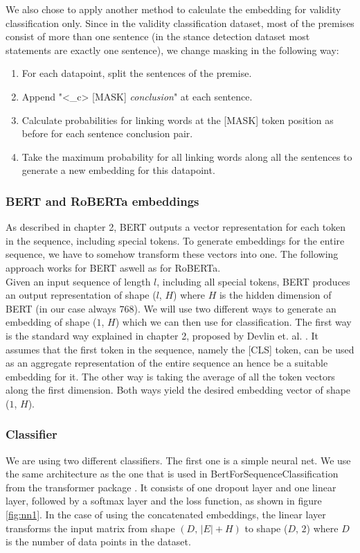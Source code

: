 We also chose to apply another method to calculate the embedding for validity classification only. Since in the validity classification dataset, most of the premises consist of more than one sentence (in the stance detection dataset most statements are exactly one sentence), we change masking in the following way: \\
\begin{enumerate}
	\item For each datapoint, split the sentences of the premise.
	\item Append "<\_c> [MASK] \textit{conclusion}" at each sentence.
	\item Calculate probabilities for linking words at the [MASK] token position as before for each sentence conclusion pair.
	\item Take the maximum probability for all linking words along all the sentences to generate a new embedding for this datapoint.
\end{enumerate}

\subsubsection{BERT and RoBERTa embeddings} \label{sec:bertembeddings}
As described in chapter 2, BERT outputs a vector representation for each token in the sequence, including special tokens. To generate embeddings for the entire sequence, we have to somehow transform these vectors into one. The following approach works for BERT aswell as for RoBERTa.\\
Given an input sequence of length $l$, including all special tokens, BERT produces an output representation of shape ($l$, $H$) where $H$ is the hidden dimension of BERT (in our case always $768$). We will use two different ways to generate an embedding of shape ($1$, $H$) which we can then use for classification. The first way is the standard way explained in chapter 2, proposed by Devlin et. al. \cite{bert}. It assumes that the first token in the sequence, namely the [CLS] token, can be used as an aggregate representation of the entire sequence an hence be a suitable embedding for it. The other way is taking the average of all the token vectors along the first dimension. Both ways yield the desired embedding vector of shape ($1$, $H$).

\subsubsection{Classifier}
We are using two different classifiers. The first one is a simple neural net. We use the same architecture as the one that is used in BertForSequenceClassification from the transformer package \cite{bertimpl}. It consists of one dropout layer and one linear layer, followed by a softmax layer and the loss function, as shown in figure \ref{fig:nn1}. In the case of using the concatenated embeddings, the linear layer transforms the input matrix from shape $(D, \, |E| + H)$ to shape ($D$, $2$) where $D$ is the number of data points in the dataset. 

